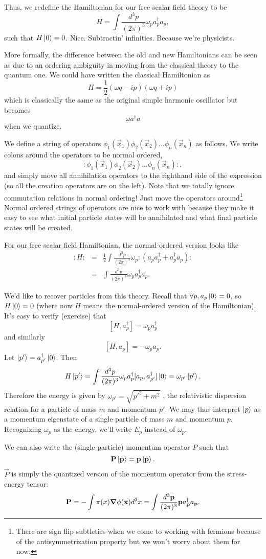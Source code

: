 Thus, we redefine the Hamiltonian for our free scalar field theory to be
$$H=\int \frac{d^3 p}{(2\pi)^3} \omega_p a_p^\dagger a_p,$$
such that $H\left| 0 \right>=0$. Nice. Subtractin' infinities. Because we're physicists.

More formally, the difference between the old and new Hamiltonians can be seen as due to an ordering ambiguity in moving from the classical theory to the quantum one. We could have written the classical Hamiltonian as
$$H=\frac{1}{2}(\omega q-ip)(\omega q+ ip)$$
which is classically the same as the original simple harmonic oscillator but becomes
$$\omega a^\dagger a$$ when we quantize.

\begin{defn}
We define a  string of operators $\phi_1(\vec x_1)\phi_2 (\vec x_2)\ldots \phi_n (\vec x_n)$ as follows.
We write colons around the operators to be normal ordered,
$$: \phi_1(\vec x_1)\phi_2 (\vec x_2)\ldots \phi_n (\vec x_n):,$$
and simply move all annihilation operators to the righthand side of the expression (so all the creation operators are on the left). Note that we totally ignore commutation relations in normal ordering! Just move the operators around\footnote{There are sign flip subtleties when we come to working with fermions because of the antisymmetrization property but we won't worry about them for now.} Normal ordered strings of operators are nice to work with because they make it easy to see what initial particle states will be annihilated and what final particle states will be created.
\end{defn}
\begin{exm}
For our free scalar field Hamiltonian, the normal-ordered version looks like
\begin{eqnarray*}
:H:&=& \frac{1}{2} \int \frac{d^3p}{(2\pi)^3} \omega_p :(a_p a_p^\dagger + a_p^\dagger a_p):\\
&=&\int \frac{d^3p}{(2\pi)^3} \omega_p a_p^\dagger a_p.
\end{eqnarray*}
\end{exm}

We'd like to recover particles from this theory. Recall that $\forall p, a_p\left| 0 \right>=0$, so $H\left| 0 \right>=0$ (where now $H$ means the normal-ordered version of the Hamiltonian). It's easy to verify (exercise) that
$$[H,a_p^\dagger] =\omega_p a_p^\dagger$$
and similarly
$$[H,a_p]=-\omega_p a_p.$$
Let $\left| p' \right>=a^\dagger_{p'}\left| 0 \right>$. Then
$$H\left| p' \right>=\int \frac{d^3 p}{(2\pi)^3} \omega_p a_p^\dagger [a_p, a_{p'}^\dagger]\left| 0 \right>=\omega_{p'}\left| p' \right>.$$
Therefore the energy is given by $\omega_{p'}=\sqrt{{p'}^2+m^2}$ , the relativistic dispersion relation for a particle of mass $m$ and momentum $p'$. We may thus interpret $\left| p \right>$ as a momentum eigenstate of a single particle of mass $m$ and momentum $p$. Recognizing $\omega_p$ as the energy, we'll write $E_p$ instead of $\omega_p$.

We can also write the (single-particle) momentum operator $P$ such that
$$\boldsymbol{\mathbf{P}}\left| \boldsymbol{\mathbf{p}} \right>=\boldsymbol{\mathbf{p}}\left| \boldsymbol{\mathbf{p}} \right>.$$
$\vec P$ is simply the quantized version of the momentum operator from the stress-energy tensor:
$$\boldsymbol{\mathbf{P}} =-\int \pi(x) \mbox{\boldmath$ \nabla $} \phi(\boldsymbol{\mathbf{x}})d^3 x=\int \frac{d^3 \boldsymbol{\mathbf{p}}}{(2\pi)^3} \boldsymbol{\mathbf{p}} a^\dagger_{\boldsymbol{\mathbf{p}}}a _{\boldsymbol{\mathbf{p}}}.$$